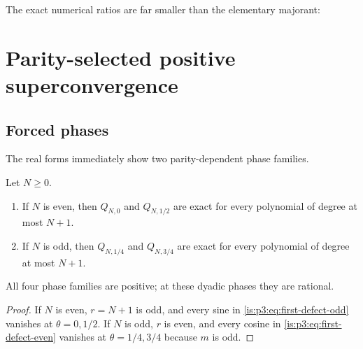 The exact numerical ratios are far smaller than the elementary majorant:
\begin{table}[H]
\centering
\caption{Absolute spectral tail divided by the first harmonic.}
\label{is:p3:tab:harmonic-tail}

\end{table}

\section{Parity-selected positive superconvergence}
\label{is:p3:sec:superconvergence}

\subsection{Forced phases}

The real forms immediately show two parity-dependent phase families.

\begin{corollary}
\label{is:p3:cor:forced-superconvergence}
Let $N\ge0$.
\begin{enumerate}
\item If $N$ is even, then $Q_{N,0}$ and $Q_{N,1/2}$ are exact for every polynomial of degree at most $N+1$.
\item If $N$ is odd, then $Q_{N,1/4}$ and $Q_{N,3/4}$ are exact for every polynomial of degree at most $N+1$.
\end{enumerate}
All four phase families are positive; at these dyadic phases they are rational.
\end{corollary}

\begin{proof}
If $N$ is even, $r=N+1$ is odd, and every sine in \eqref{is:p3:eq:first-defect-odd} vanishes at $\theta=0,1/2$.  If $N$ is odd, $r$ is even, and every cosine in \eqref{is:p3:eq:first-defect-even} vanishes at $\theta=1/4,3/4$ because $m$ is odd.
\end{proof}

